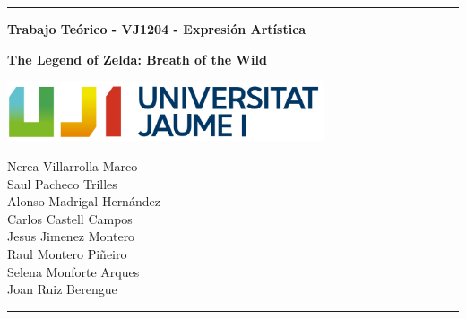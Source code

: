 \documentclass[12pt]{article}
\date{}
\begin{document}
    \begin{titlepage}

        \centering
        \hrule
        \vspace{1cm}
        {\bfseries\huge Trabajo Teórico - VJ1204 - Expresión Artística \par}
        \vspace{1cm}
        {\bfseries\huge The Legend of Zelda: Breath of the Wild \par}
        \vspace{3cm}
        {\includegraphics[width=0.7\textwidth]{images/UJI_logo.jpg} \par}
        \vspace{4cm}

        {\large
        Nerea Villarrolla Marco \\
        Saul Pacheco Trilles \\
        Alonso Madrigal Hernández \\
        Carlos Castell Campos \\
        Jesus Jimenez Montero \\
        Raul Montero Piñeiro \\
        Selena Monforte Arques \\
        Joan Ruiz Berengue \\
        \par}
        \vspace{10cm}
        \hrule

    \end{titlepage}

\newpage
\begin{abstract}
    En el siguiente documento hablaremos sobre las bases artísticas del videojuego “The Legend Of Zelda: Breath of the wild". Tanto del director de concept art como un atisbo de información sobre el juego. Finalemnete acabaremos con el analisis artistico profundo de varios fan arts.

\end{abstract}
\end{document}
